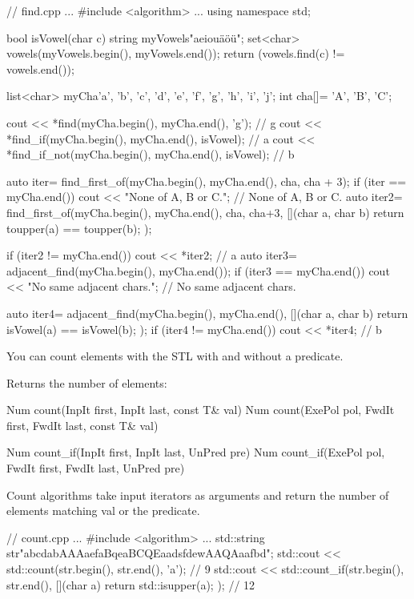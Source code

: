 \begin{cpp}
// find.cpp
...
#include <algorithm>
...
using namespace std;

bool isVowel(char c){
	string myVowels{"aeiouäöü"};
	set<char> vowels(myVowels.begin(), myVowels.end());
	return (vowels.find(c) != vowels.end());
}

list<char> myCha{'a', 'b', 'c', 'd', 'e', 'f', 'g', 'h', 'i', 'j'};
int cha[]= {'A', 'B', 'C'};

cout << *find(myCha.begin(), myCha.end(), 'g'); // g
cout << *find_if(myCha.begin(), myCha.end(), isVowel); // a
cout << *find_if_not(myCha.begin(), myCha.end(), isVowel); // b

auto iter= find_first_of(myCha.begin(), myCha.end(), cha, cha + 3);
if (iter == myCha.end()) cout << "None of A, B or C."; // None of A, B or C.
auto iter2= find_first_of(myCha.begin(), myCha.end(), cha, cha+3,
				[](char a, char b){ return toupper(a) == toupper(b); });
				
if (iter2 != myCha.end()) cout << *iter2; // a
auto iter3= adjacent_find(myCha.begin(), myCha.end());
if (iter3 == myCha.end()) cout << "No same adjacent chars.";
										// No same adjacent chars.
										
auto iter4= adjacent_find(myCha.begin(), myCha.end(),
				[](char a, char b){ return isVowel(a) == isVowel(b); });
if (iter4 != myCha.end()) cout << *iter4; // b
\end{cpp}


You can count elements with the STL with and without a predicate.

Returns the number of elements:

\begin{cpp}
Num count(InpIt first, InpIt last, const T& val)
Num count(ExePol pol, FwdIt first, FwdIt last, const T& val)

Num count_if(InpIt first, InpIt last, UnPred pre)
Num count_if(ExePol pol, FwdIt first, FwdIt last, UnPred pre)
\end{cpp}

Count algorithms take input iterators as arguments and return the number of elements matching val or the predicate.


\begin{cpp}
// count.cpp
...
#include <algorithm>
...
std::string str{"abcdabAAAaefaBqeaBCQEaadsfdewAAQAaafbd"};
std::cout << std::count(str.begin(), str.end(), 'a'); // 9
std::cout << std::count_if(str.begin(), str.end(),
							[](char a){ return std::isupper(a); }); // 12
\end{cpp}


